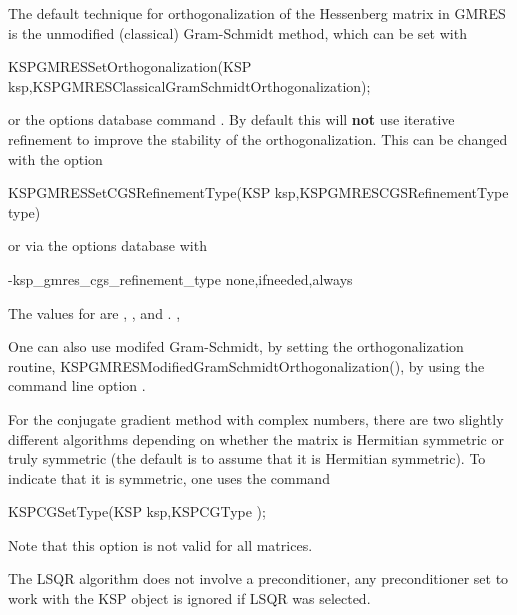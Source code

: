 The default technique for orthogonalization of the Hessenberg
matrix in GMRES is 
the
unmodified (classical) Gram-Schmidt method, which can be set 
with  
\begin{tabbing}
  KSPGMRESSetOrthogonalization(KSP ksp,KSPGMRESClassicalGramSchmidtOrthogonalization);
\end{tabbing}
or the options database 
command .
By default this will {\bf not} use iterative refinement to improve the 
stability of the orthogonalization.
This can be changed with the option
\begin{tabbing}
KSPGMRESSetCGSRefinementType(KSP ksp,KSPGMRESCGSRefinementType type)
\end{tabbing}
 
or via the options database with 
\begin{tabbing}
-ksp\_gmres\_cgs\_refinement\_type none,ifneeded,always
\end{tabbing}
The values for  are ,
,
 and .
, 

One can also use 
modifed Gram-Schmidt, 
 by setting the orthogonalization routine,
KSPGMRESModifiedGramSchmidtOrthogonalization(), by using the command line option 
. 

For the conjugate gradient method with complex numbers, there are two
slightly different algorithms depending on whether the matrix is 
Hermitian symmetric or truly symmetric (the default is to assume that
it is Hermitian symmetric). To indicate that it is symmetric, one uses the command
  
\begin{tabbing}
  KSPCGSetType(KSP ksp,KSPCGType );
\end{tabbing}
Note that this option is not valid for all matrices.

The LSQR algorithm does not involve a preconditioner, any preconditioner
set to work with the KSP object is ignored if LSQR was selected.

